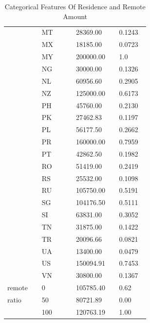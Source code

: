 \documentclass[11pt,a4paper]{article}
\begin{document}
\begin{table}
\begin{tabular}{p{0.15\linewidth}|p{0.18\linewidth}|p{0.15\linewidth}|p{0.10\linewidth}}
&MT&28369.00&0.1243\\
&MX&18185.00&0.0723\\
&MY&200000.00&1.0\\
&NG&30000.00&0.1326\\
&NL&60956.60&0.2905\\
&NZ&125000.00&0.6173\\
&PH&45760.00&0.2130\\
&PK&27462.83&0.1197\\
&PL&56177.50&0.2662\\
&PR&160000.00&0.7959\\
&PT&42862.50&0.1982\\
&RO&51419.00&0.2419\\
&RS&25532.00&0.1098\\
&RU&105750.00&0.5191\\
&SG&104176.50&0.5111\\
&SI&63831.00&0.3052\\
&TN&31875.00&0.1422\\
&TR&20096.66&0.0821\\
&UA&13400.00&0.0479\\
&US&150094.91&0.7453\\
&VN&30800.00&0.1367\\
\hline
remote&0&105785.40&0.62\\
ratio&50&80721.89&0.00\\
&100&120763.19&1.00\\
\hline\end{tabular}
\caption{Categorical Features Of Residence and Remote Amount}
\label{tab:Categorical Features Of Residence and Remote Amount}
\end{table}
\end{document}
